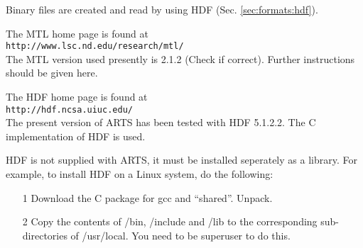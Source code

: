  \label{sec:formats:file:binary}
  
 Binary files are created and read by using HDF (Sec.
 \ref{sec:formats:hdf}). 

 


 \label{sec:formats:mtl}

 The MTL home page is found at \\

 \verb|http://www.lsc.nd.edu/research/mtl/| \\

 \noindent
 The MTL version used presently is 2.1.2 (Check if correct). 
 Further instructions should be given here.


 \label{sec:formats:hdf}

 The HDF home page is found at \\

 \verb|http://hdf.ncsa.uiuc.edu/| \\

 \noindent
 The present version of ARTS has been tested with HDF 5.1.2.2. The C
 implementation of HDF is used.
 
 HDF is not supplied with ARTS, it must be installed seperately as a
 library. For example, to install HDF on a Linux system, do the following:
 \begin{itemize}
  \item[1] Download the C package for gcc and ``shared''. Unpack.
  \item[2] Copy the contents of /bin, /include and /lib to the corresponding
           sub-directories of /usr/local. You need to be superuser to do 
           this.  
 \end{itemize}



